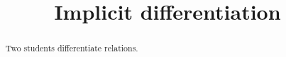 \documentclass{ximera}
\title[Break-Ground:]{Implicit differentiation}
\begin{document}
\begin{abstract}
Two students differentiate relations.
\end{abstract}
\maketitle









\end{document}
